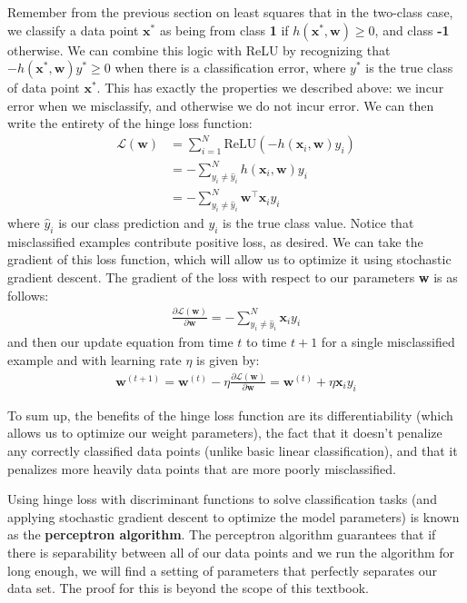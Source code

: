 Remember from the previous section on least squares that in the two-class case, we classify a data point $\textbf{x}^{*}$ as being from class 
\textbf{1} if $h(\textbf{x}^{*}, \textbf{w}) \geq 0$, and class \textbf{-1} otherwise. We can combine this logic with ReLU by recognizing that $-h(\textbf{x}^{*}, \textbf{w})y^{*} \geq 0$ when there is a classification error, where $y^{*}$ is the true class of data point $\textbf{x}^{*}$. This has exactly the properties we described above: we incur error when we misclassify, and otherwise we do not incur error. \newline \newline
We can then write the entirety of the hinge loss function:
\begin{align}
	\mathcal{L}(\textbf{w}) &= \sum_{i=1}^{N} \text{ReLU}(-h(\textbf{x}_{i}, \textbf{w})y_{i}) \\
	&= -\sum_{y_{i} \neq \hat{y}_{i}}^{N} h(\textbf{x}_{i}, \textbf{w})y_{i} \\
	&= -\sum_{y_{i} \neq \hat{y}_{i}}^{N} \textbf{w}^\top\textbf{x}_{i} y_{i}
\end{align}
where $\hat{y}_{i}$ is our class prediction and $y_{i}$ is the true class value. Notice that misclassified examples contribute positive loss, as desired. We can take the gradient of this loss function, which will allow us to optimize it using stochastic gradient descent. The gradient of the loss with respect to our parameters \textbf{w} is as follows:
\begin{align*}
	\frac{\partial \mathcal{L}(\textbf{w})}{\partial \textbf{w}} = -\sum_{y_{i} \neq \hat{y}_{i}}^{N} \textbf{x}_{i} y_{i}
\end{align*}
and then our update equation from time $t$ to time $t+1$ for a single misclassified example and with learning rate $\eta$ is given by:
\begin{align*}
	\textbf{w}^{(t+1)} = \textbf{w}^{(t)} - \eta\frac{\partial \mathcal{L}(\textbf{w})}{\partial \textbf{w}} = \textbf{w}^{(t)} + \eta \textbf{x}_{i} y_{i}
\end{align*}

To sum up, the benefits of the hinge loss function are its differentiability (which allows us to optimize our weight parameters), the fact that it doesn't penalize any correctly classified data points (unlike basic linear classification), and that it penalizes more heavily data points that are more poorly misclassified.

Using hinge loss with discriminant functions to solve classification tasks (and applying stochastic gradient descent to optimize the model parameters) is known as the \textbf{perceptron algorithm}. The perceptron algorithm guarantees that if there is separability between all of our data points and we run the algorithm for long enough, we will find a setting of parameters that perfectly separates our data set. The proof for this is beyond the scope of this textbook.

